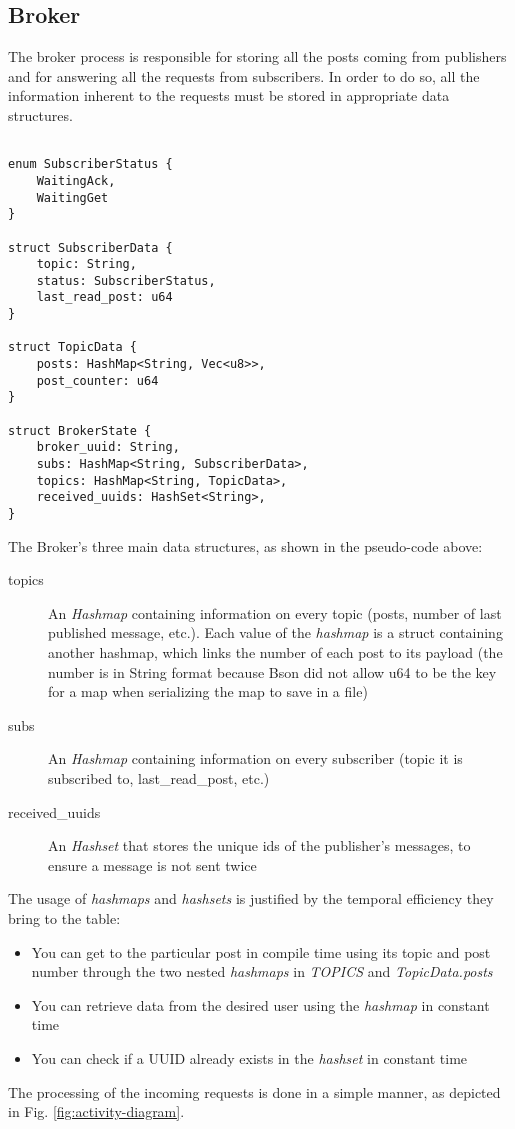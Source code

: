 \subsection{Broker}

The broker process is responsible for storing all the posts coming from publishers and for answering all the requests from subscribers. In order to do so, all the information inherent to the requests must be stored in appropriate data structures.

\begin{lstlisting}

enum SubscriberStatus {
    WaitingAck,
    WaitingGet
}

struct SubscriberData {
    topic: String,
    status: SubscriberStatus,
    last_read_post: u64
}

struct TopicData {
    posts: HashMap<String, Vec<u8>>,
    post_counter: u64
}

struct BrokerState {
    broker_uuid: String,
    subs: HashMap<String, SubscriberData>,
    topics: HashMap<String, TopicData>,
    received_uuids: HashSet<String>,
}
\end{lstlisting}

The Broker's three main data structures, as shown in the pseudo-code above:

\begin{description}
    \item[topics] An \emph{Hashmap} containing information on every topic (posts, number of last published message, etc.). Each value of the \emph{hashmap} is a struct containing another hashmap, which links the number of each post to its payload (the number is in String format because Bson did not allow u64 to be the key for a map when serializing the map to save in a file) 
    \item[subs] An \emph{Hashmap} containing information on every subscriber (topic it is subscribed to, last\_read\_post, etc.)
    \item[received\_uuids] An \emph{Hashset} that stores the unique ids of the publisher's messages, to ensure a message is not sent twice
\end{description}

The usage of \emph{hashmaps} and \emph{hashsets} is justified by the temporal efficiency they bring to the table:
    
\begin{itemize}
    \item You can get to the particular post in compile time using its topic and post number through the two nested \emph{hashmaps} in \emph{TOPICS} and \emph{TopicData.posts}  
    \item You can retrieve data from the desired user using the \emph{hashmap} in constant time
    \item You can check if a UUID already exists in the \emph{hashset} in constant time
\end{itemize}

The processing of the incoming requests is done in a simple manner, as depicted in Fig. \ref{fig:activity-diagram}.

